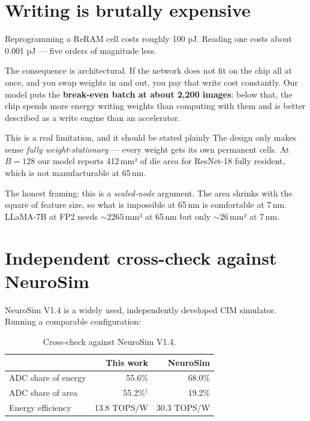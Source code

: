 \documentclass[11pt,a4paper]{report}
\begin{document}
\section{Writing is brutally expensive}

Reprogramming a ReRAM cell costs roughly 100 pJ. Reading one costs about
0.001 pJ --- five orders of magnitude less.

The consequence is architectural. If the network does not fit on the chip all
at once, and you swap weights in and out, you pay that write cost constantly.
Our model puts the \textbf{break-even batch at about 2{,}200 images}: below
that, the chip spends more energy writing weights than computing with them
and is better described as a write engine than an accelerator.

\begin{warnbox}{This is a real limitation, and it should be stated plainly}
The design only makes sense \emph{fully weight-stationary} --- every weight
gets its own permanent cells. At $B=128$ our model reports 412\,mm² of die
area for ResNet-18 fully resident, which is not manufacturable at 65\,nm.

The honest framing: this is a \emph{scaled-node} argument. The area shrinks
with the square of feature size, so what is impossible at 65\,nm is
comfortable at 7\,nm. LLaMA-7B at FP2 needs ${\sim}2265$\,mm² at 65\,nm but
only ${\sim}26$\,mm² at 7\,nm.
\end{warnbox}

\section{Independent cross-check against NeuroSim}

NeuroSim V1.4 is a widely used, independently developed CIM simulator. Running
a comparable configuration:

\begin{table}[h]
\centering
\caption{Cross-check against NeuroSim V1.4.}
\begin{tabular}{lrr}
\toprule
 & This work & NeuroSim \\
\midrule
ADC share of energy & 55.6\% & 68.0\% \\
ADC share of area & 55.2\%$^\dagger$ & 19.2\% \\
Energy efficiency & 13.8 TOPS/W & 30.3 TOPS/W \\
\bottomrule
\end{tabular}
\end{table}
\end{document}
